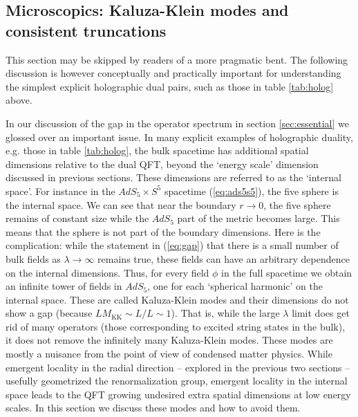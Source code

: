 \documentclass[10pt, oneside]{book}
\begin{document}
\begin{doublespace}
\subsection{Microscopics: Kaluza-Klein modes and consistent truncations}
\label{sec:consistent}

This section may be skipped by readers of a more pragmatic bent. The following discussion is however conceptually and practically important for understanding the simplest explicit holographic dual pairs, such as those in table \ref{tab:holog} above.

In our discussion of the gap in the operator spectrum in section \ref{sec:essential} we glossed over an important issue. In many explicit examples of holographic duality, e.g. those in table \ref{tab:holog}, the bulk spacetime has additional spatial dimensions relative to the dual QFT, beyond the `energy scale' dimension discussed in previous sections. These dimensions are referred to as the `internal space'. For instance in the $AdS_5 \times S^5$ spacetime (\ref{eq:ads5s5}), the five sphere is the internal space. We can see that near the boundary $r \to 0$, the five sphere remains of constant size while the $AdS_5$ part of the metric becomes large. This means that the sphere is not part of the boundary dimensions. Here is the complication: while the statement in (\ref{eq:gap}) that there is a small number of bulk fields as $\lambda \to \infty$ remains true, these fields can have an arbitrary dependence on the internal dimensions. Thus, for every field $\phi$ in the full spacetime we obtain an infinite tower of fields in $AdS_5$, one for each `spherical harmonic' on the internal space. These are called Kaluza-Klein modes and their dimensions do not show a gap (because $L M_\text{KK} \sim L/L \sim 1$). That is, while the large $\lambda$ limit does get rid of many operators (those corresponding to excited string states in the bulk), it does not remove the infinitely many Kaluza-Klein modes. These modes are mostly a nuisance from the point of view of condensed matter physics. While emergent locality in the radial direction -- explored in the previous two sections -- usefully geometrized the renormalization group, emergent locality in the internal space leads to the QFT growing undesired extra spatial dimensions at low energy scales. In this section we discuss these modes and how to avoid them.


\end{doublespace}
\end{document}
